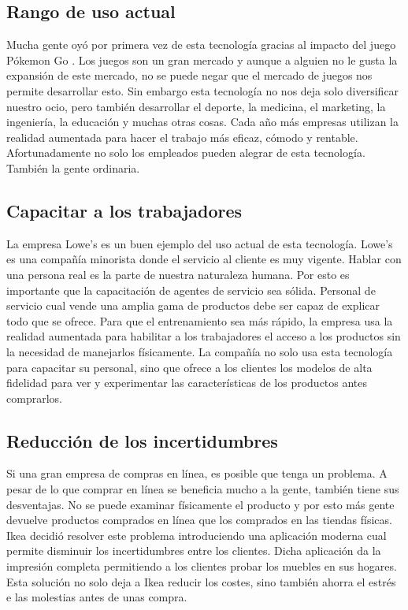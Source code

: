 \documentclass[a4paper,11pt]{scrartcl}
\begin{document}
\subsection{Rango de uso actual}
Mucha gente oyó por primera vez de esta tecnología gracias al impacto del juego Pókemon Go \cite{pokemongo}. Los juegos son un gran mercado y aunque a alguien no le gusta la expansión de este mercado, no se puede negar que el mercado de juegos nos permite desarrollar esto. Sin embargo esta tecnología no nos deja solo diversificar nuestro ocio, pero también desarrollar el deporte, la medicina, el marketing, la ingeniería, la educación y muchas otras cosas. Cada año más empresas utilizan la realidad aumentada para hacer el trabajo más eficaz, cómodo y rentable. Afortunadamente no solo los empleados pueden alegrar de esta tecnología. También la gente ordinaria.

\subsection{Capacitar a los trabajadores}
La empresa Lowe's es un buen ejemplo del uso actual de esta tecnología. Lowe's es una compañía minorista donde el servicio al cliente es muy vigente. Hablar con una persona real es la parte de nuestra naturaleza humana. Por esto es importante que la capacitación de agentes de servicio sea sólida. Personal de servicio cual vende una amplia gama de productos debe ser capaz de explicar todo que se ofrece. Para que el entrenamiento sea más rápido, la empresa usa la realidad aumentada\cite{lowe} para habilitar a los trabajadores el acceso a los productos sin la necesidad de manejarlos físicamente. La compañía no solo usa esta tecnología para capacitar su personal, sino que ofrece a los clientes los modelos de alta fidelidad para ver y experimentar las características de los productos antes comprarlos.


\subsection{Reducción de los incertidumbres}
Si  una gran empresa de compras en línea, es posible que tenga un problema. A pesar de lo que comprar en línea se beneficia mucho a la gente, también tiene sus desventajas. No se puede examinar físicamente el producto y por esto más gente devuelve productos comprados en línea que los comprados en las tiendas físicas\cite{seo}. Ikea decidió resolver este problema introduciendo una aplicación moderna\cite{ikea} cual permite disminuir los incertidumbres entre los clientes. Dicha aplicación da la impresión completa permitiendo a los clientes probar los muebles en sus hogares. Esta solución no solo deja a Ikea reducir los costes, sino también ahorra el estrés e las molestias antes de unas compra.
\end{document}
